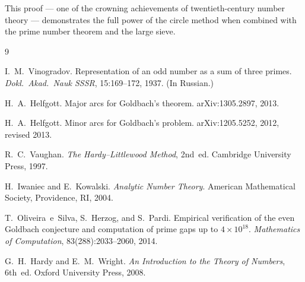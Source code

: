 \documentclass[12pt,a4paper]{amsart}
\theoremstyle{definition}
\begin{document}
This proof — one of the crowning achievements of twentieth-century
number theory — demonstrates the full power of the circle method when
combined with the prime number theorem and the large sieve.

\begin{thebibliography}{9}

I.~M.~Vinogradov.
\newblock Representation of an odd number as a sum of three primes.
\newblock \emph{Dokl.\ Akad.\ Nauk SSSR}, 15:169--172, 1937.
\newblock (In Russian.)

H.~A.~Helfgott.
\newblock Major arcs for Goldbach's theorem.
\newblock arXiv:1305.2897, 2013.

H.~A.~Helfgott.
\newblock Minor arcs for Goldbach's problem.
\newblock arXiv:1205.5252, 2012, revised 2013.

R.~C.~Vaughan.
\newblock \emph{The Hardy--Littlewood Method}, 2nd~ed.
\newblock Cambridge University Press, 1997.

H.~Iwaniec and E.~Kowalski.
\newblock \emph{Analytic Number Theory}.
\newblock American Mathematical Society, Providence, RI, 2004.

T.~Oliveira~e~Silva, S.~Herzog, and S.~Pardi.
\newblock Empirical verification of the even Goldbach conjecture and computation
  of prime gaps up to $4 \times 10^{18}$.
\newblock \emph{Mathematics of Computation}, 83(288):2033--2060, 2014.

G.~H.~Hardy and E.~M.~Wright.
\newblock \emph{An Introduction to the Theory of Numbers}, 6th~ed.
\newblock Oxford University Press, 2008.

\end{thebibliography}
\end{document}

